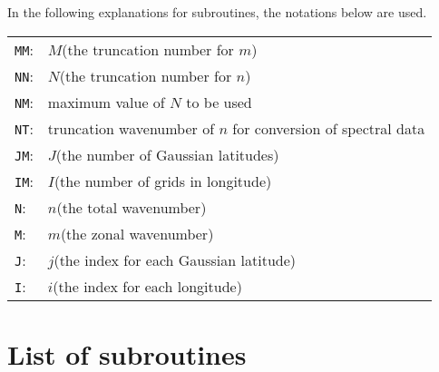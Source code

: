 \documentclass[a4paper]{scrartcl}
\begin{document}
In the following explanations for subroutines, the notations below
are used.
\begin{center}
\begin{tabular}{ll}
\texttt{MM}:& $M$(the truncation number for $m$)\\
\texttt{NN}:& $N$(the truncation number for $n$)\\
\texttt{NM}:& maximum value of $N$ to be used\\
\texttt{NT}:& truncation wavenumber of $n$ for conversion of
spectral data\\
\texttt{JM}:& $J$(the number of Gaussian latitudes)\\
\texttt{IM}:& $I$(the number of grids in longitude)\\
\texttt{N}:& $n$(the total wavenumber)\\
\texttt{M}:& $m$(the zonal wavenumber)\\
\texttt{J}:& $j$(the index for each Gaussian latitude)\\
\texttt{I}:& $i$(the index for each longitude)
\end{tabular}
\end{center}


\section{List of subroutines}
\end{document}
